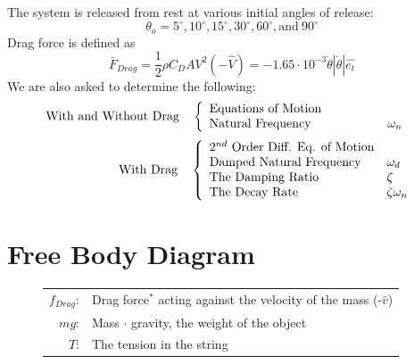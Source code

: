 \documentclass[12pt]{report}
\begin{document}
\begin{flushleft}
The system is released from rest at various initial angles of release:
$$\theta_o = 5^\circ,10^\circ, 15^\circ, 30^\circ, 60^\circ, \textrm{and}~90^\circ$$
Drag force is defined as
\begin{equation} \label{eq:drag}
\bar{F}_{Drag}=\frac{1}{2}\rho C_DAV^2\left(-\hat{V}\right)=-1.65 \cdot10^{-3}\dot{\theta}|\dot{\theta}|\hat{e_t}
\end{equation}
We are also asked to determine the following: \\
\begin{equation}
\textrm{With and Without Drag\quad}\left\{
\begin{array}{ll}
  \textrm{Equations of Motion}& \\
  \textrm{Natural Frequency } &\hspace{10ex}\omega_n\hspace{1.5ex} \\
\end{array}
\nonumber
\right.
\end{equation}
\begin{equation}
\textrm{\phantom{and Without}With Drag\quad}\left\{
\begin{array}{ll}
  \textrm{$2^{nd}$ Order Diff. Eq. of Motion} & \\
  \textrm{Damped Natural Frequency } &\omega_d \\
  \textrm{The Damping Ratio} & \zeta \\
  \textrm{The Decay Rate} & \zeta\omega_n \\
\end{array}
\right.
\nonumber
\end{equation}
\newpage

\section{Free Body Diagram}

\begin{figure}[ht]
  \centering
   \begin{minipage}[c]{.2\textwidth}
      
   \end{minipage}%
   \begin{minipage}[c]{.8\textwidth}
     \flushleft
     \begin{tabular}{rl}
     $f_{Drag}$:&Drag force$^*$ acting against the velocity of the mass (-$\hat{v}$)\\
     $mg$:&Mass $\cdot$ gravity, the weight of the object\\
     $T$:&The tension in the string\\
   \end{tabular}
   \end{minipage}
 \end{figure}


\end{flushleft}
\end{document}
